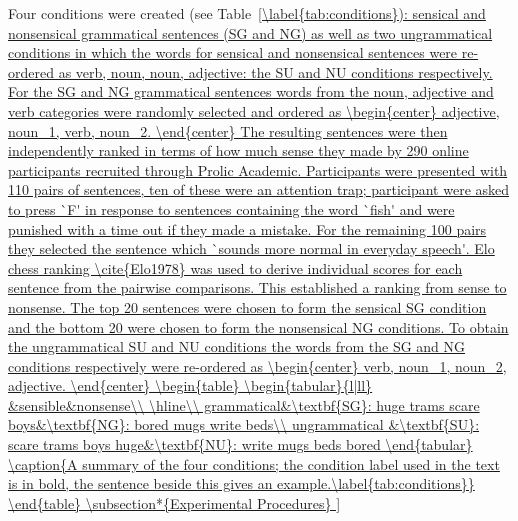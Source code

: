\documentclass[a4paper,10pt,twoside]{article}
\begin{document}
Four conditions were created (see Table~\ref{\label{tab:conditions}): sensical and nonsensical
grammatical sentences (SG and NG) as well as two ungrammatical
conditions in which the words for sensical and nonsensical sentences
were re-ordered as verb, noun, noun, adjective: the SU and NU
conditions respectively. For the SG and NG grammatical sentences words
from the noun, adjective and verb categories were randomly selected
and ordered as
\begin{center}
  adjective, noun_1, verb, noun_2.
\end{center}
The resulting sentences were then independently ranked in terms of how
much sense they made by 290 online participants recruited through
Prolic Academic. Participants were presented with 110 pairs of
sentences, ten of these were an attention trap; participant were asked
to press `F' in response to sentences containing the word `fish' and
were punished with a time out if they made a mistake. For the
remaining 100 pairs they selected the sentence which `sounds more
normal in everyday speech'. Elo chess ranking \cite{Elo1978} was used
to derive individual scores for each sentence from the pairwise
comparisons. This established a ranking from sense to nonsense. The
top 20 sentences were chosen to form the sensical SG condition and the
bottom 20 were chosen to form the nonsensical NG conditions.  To
obtain the ungrammatical SU and NU conditions the words from the SG
and NG conditions respectively were re-ordered as
\begin{center}
verb, noun_1, noun_2, adjective.
\end{center}

\begin{table}
\begin{tabular}{l|ll}
&sensible&nonsense\\
\hline\\
grammatical&\textbf{SG}: huge trams scare boys&\textbf{NG}: bored mugs write beds\\
ungrammatical &\textbf{SU}: scare trams boys huge&\textbf{NU}: write mugs beds bored
\end{tabular}
\caption{A summary of the four conditions; the condition label used in the text is in
  bold, the sentence beside this gives an
  example.\label{tab:conditions}}
\end{table}

\subsection*{Experimental Procedures}

}
\end{document}
